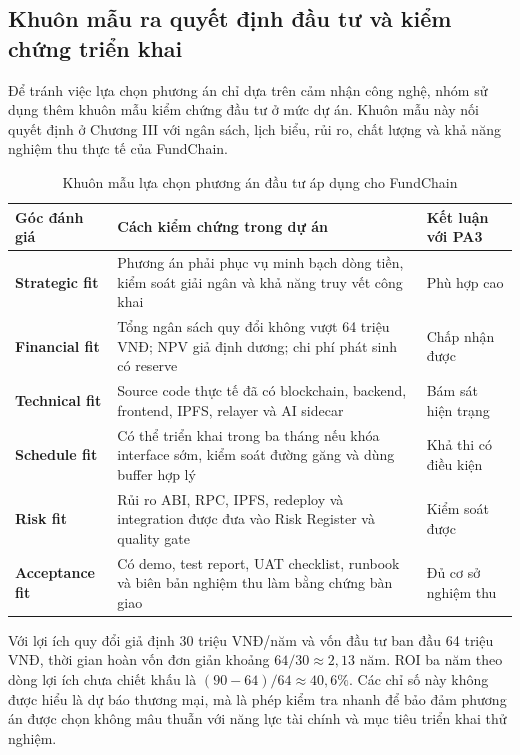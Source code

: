 
\subsection{Khuôn mẫu ra quyết định đầu tư và kiểm chứng triển khai}

Để tránh việc lựa chọn phương án chỉ dựa trên cảm nhận công nghệ, nhóm sử dụng thêm khuôn mẫu kiểm chứng đầu tư ở mức dự án. Khuôn mẫu này nối quyết định ở Chương III với ngân sách, lịch biểu, rủi ro, chất lượng và khả năng nghiệm thu thực tế của FundChain.

\begin{table}[H]
\centering
\caption{Khuôn mẫu lựa chọn phương án đầu tư áp dụng cho FundChain}
\label{tab:investment-selection-framework}
\begin{tabularx}{\textwidth}{| >{\bfseries}p{3.6cm} | X | >{\raggedright\arraybackslash}p{3.2cm} |}
\hline
Góc đánh giá & Cách kiểm chứng trong dự án & Kết luận với PA3 \\
\hline
Strategic fit & Phương án phải phục vụ minh bạch dòng tiền, kiểm soát giải ngân và khả năng truy vết công khai & Phù hợp cao \\ \hline
Financial fit & Tổng ngân sách quy đổi không vượt 64 triệu VNĐ; NPV giả định dương; chi phí phát sinh có reserve & Chấp nhận được \\ \hline
Technical fit & Source code thực tế đã có blockchain, backend, frontend, IPFS, relayer và AI sidecar & Bám sát hiện trạng \\ \hline
Schedule fit & Có thể triển khai trong ba tháng nếu khóa interface sớm, kiểm soát đường găng và dùng buffer hợp lý & Khả thi có điều kiện \\ \hline
Risk fit & Rủi ro ABI, RPC, IPFS, redeploy và integration được đưa vào Risk Register và quality gate & Kiểm soát được \\ \hline
Acceptance fit & Có demo, test report, UAT checklist, runbook và biên bản nghiệm thu làm bằng chứng bàn giao & Đủ cơ sở nghiệm thu \\
\hline
\end{tabularx}
\end{table}

Với lợi ích quy đổi giả định 30 triệu VNĐ/năm và vốn đầu tư ban đầu 64 triệu VNĐ, thời gian hoàn vốn đơn giản khoảng $64/30 \approx 2{,}13$ năm. ROI ba năm theo dòng lợi ích chưa chiết khấu là $(90-64)/64 \approx 40{,}6\%$. Các chỉ số này không được hiểu là dự báo thương mại, mà là phép kiểm tra nhanh để bảo đảm phương án được chọn không mâu thuẫn với năng lực tài chính và mục tiêu triển khai thử nghiệm.

